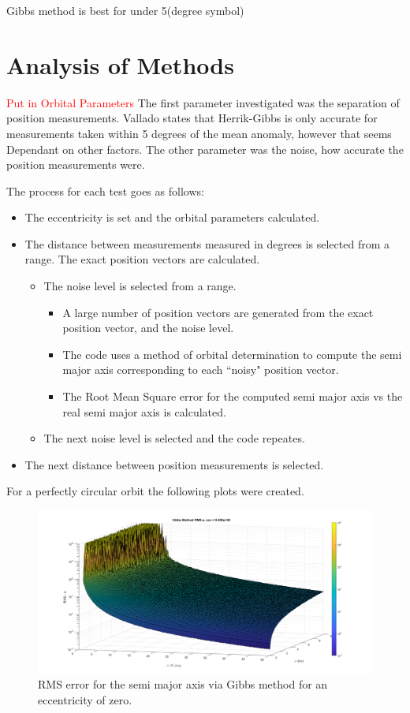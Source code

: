 \documentclass[12pt]{article}
\begin{document}
	Gibbs method is best for under 5(degree symbol)
	\section{Analysis of Methods}
	\textcolor{red}{Put in Orbital Parameters}
	The first parameter investigated was the separation of position measurements.  Vallado\cite{vallado2007fundamentals} states that Herrik-Gibbs is only accurate for measurements taken within 5 degrees of the mean anomaly, however that seems Dependant on other factors. The other parameter was the noise, how accurate the position measurements were. 
	
	The process for each test goes as follows:
	\begin{itemize}
		\item The eccentricity is set and the orbital parameters calculated.
		\item The distance between measurements measured in degrees is selected from a range. The exact position vectors are calculated.
		\begin{itemize}
			\item The noise level is selected from a range. 
			\begin{itemize}
				\item A large number of position vectors are generated from the exact position vector, and the noise level.
				\item The code uses a method of orbital determination to compute the semi major axis corresponding to each ``noisy" position vector. 
				\item The Root Mean Square error for the computed semi major axis vs the real semi major axis is calculated. 

			\end{itemize}
				\item The next noise level is selected and the code repeates.
		\end{itemize}
		\item The next distance between position measurements is selected.
	\end{itemize}

	For a perfectly circular orbit the following plots were created.
	\begin{figure}
		\centering
		\includegraphics[width=0.7\linewidth]{circularGibbs}
		\caption{RMS error for the semi major axis via Gibbs method for an eccentricity of zero.}
		\label{fig:circulargibbs}
	\end{figure}
\end{document}
